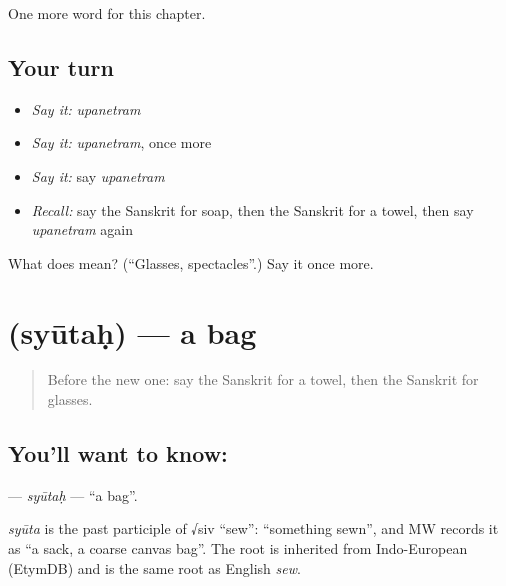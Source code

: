 \begin{grammarlens}[title={What you've built}]
One more word for this chapter.
\end{grammarlens}

\subsection*{Your turn}
\begin{itemize}
\raggedright
  \item \emph{Say it:} \emph{upanetram}
  \item \emph{Say it:} \emph{upanetram}, once more
  \item \emph{Say it:} say \emph{upanetram}
  \item \emph{Recall:} say the Sanskrit for soap, then the Sanskrit for a towel, then say \emph{upanetram} again
\end{itemize}

\begin{tcolorbox}[breakable,colback=teal!4,colframe=teal!35!black,title={Before you move on}]
What does  mean? (\textquotedblleft{}Glasses, spectacles\textquotedblright{}.) Say it once more.
\end{tcolorbox}
\section[\texorpdfstring{\sk{स्यूतः} (syūtaḥ)}{स्यूतः (syūtaḥ)}]{ (syūtaḥ) — a bag}

\label{lesson:SA-C101-syutah}



\begin{quote}
Before the new one: say the Sanskrit for a towel, then the Sanskrit for glasses.
\end{quote}

\subsection*{You'll want to know: }
\textbf{} — \emph{syūtaḥ} — \textquotedblleft{}a bag\textquotedblright{}.

\begin{cousinweb}
\emph{syūta} is the past participle of √siv \textquotedblleft{}sew\textquotedblright{}: \textquotedblleft{}something sewn\textquotedblright{}, and MW records it as \textquotedblleft{}a sack, a coarse canvas bag\textquotedblright{}. The root is inherited from Indo-European (EtymDB) and is the same root as English \emph{sew}.
\end{cousinweb}

